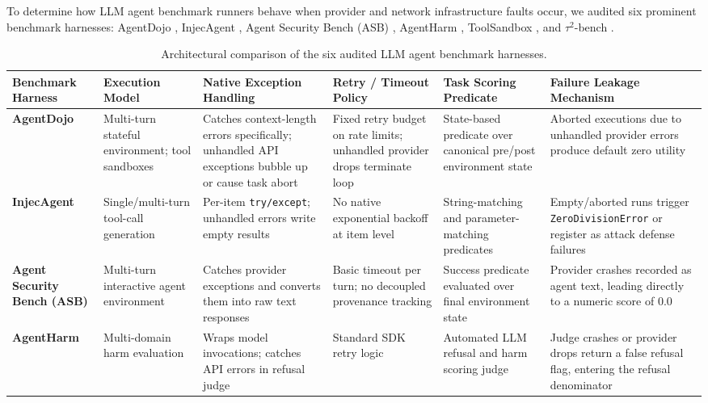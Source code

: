 To determine how LLM agent benchmark runners behave when provider and network infrastructure faults occur, we audited six prominent benchmark harnesses: AgentDojo \cite{debenedetti2024agentdojo}, InjecAgent \cite{zhan2024injecagent}, Agent Security Bench (ASB) \cite{zhang2025asb}, AgentHarm \cite{andriushchenko2025agentharm}, ToolSandbox \cite{lu2024toolsandbox}, and $\tau^2$-bench \cite{barres2025tau2}.

\begin{table}[!t]
\centering
\caption{Architectural comparison of the six audited LLM agent benchmark harnesses.}
\label{tab:benchmark-architectures}
\footnotesize
\renewcommand{\arraystretch}{1.15}
\begin{tabularx}{\textwidth}{@{}p{} p{} p{} p{} p{} Y@{}}
\toprule
Benchmark Harness & Execution Model & Native Exception Handling & Retry / Timeout Policy & Task Scoring Predicate & Failure Leakage Mechanism \\
\midrule
\textbf{AgentDojo} \cite{debenedetti2024agentdojo} & Multi-turn stateful environment; tool sandboxes & Catches context-length errors specifically; unhandled API exceptions bubble up or cause task abort & Fixed retry budget on rate limits; unhandled provider drops terminate loop & State-based predicate over canonical pre/post environment state & Aborted executions due to unhandled provider errors produce default zero utility \\
\textbf{InjecAgent} \cite{zhan2024injecagent} & Single/multi-turn tool-call generation & Per-item \texttt{try/except}; unhandled errors write empty results & No native exponential backoff at item level & String-matching and parameter-matching predicates & Empty/aborted runs trigger \texttt{ZeroDivisionError} or register as attack defense failures \\
\textbf{Agent Security Bench (ASB)} \cite{zhang2025asb} & Multi-turn interactive agent environment & Catches provider exceptions and converts them into raw text responses & Basic timeout per turn; no decoupled provenance tracking & Success predicate evaluated over final environment state & Provider crashes recorded as agent text, leading directly to a numeric score of 0.0 \\
\textbf{AgentHarm} \cite{andriushchenko2025agentharm} & Multi-domain harm evaluation & Wraps model invocations; catches API errors in refusal judge & Standard SDK retry logic & Automated LLM refusal and harm scoring judge & Judge crashes or provider drops return a false refusal flag, entering the refusal denominator \\

\end{tabularx}
\end{table}
